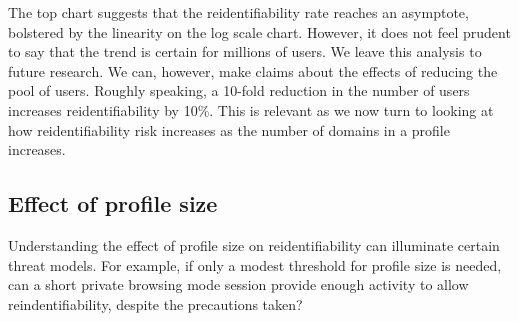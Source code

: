 \documentclass[letterpaper,twocolumn,10pt]{article}
\begin{document}
The top chart suggests that the reidentifiability rate reaches an asymptote, bolstered by the linearity on the log scale chart. 
However, it does not feel prudent to say that the trend is certain for millions of users. 
We leave this analysis to future research. 
We can, however, make claims about the effects of reducing the pool of users. 
Roughly speaking, a 10-fold reduction in the number of users increases reidentifiability by 10\%. 
This is relevant as we now turn to looking at how reidentifiability risk increases as the number of domains in a profile increases.
%
\subsection{Effect of profile size}
\label{ssec:ext-profile-size}
%
Understanding the effect of profile size on reidentifiability can illuminate certain threat models.
For example, if only a modest threshold for profile size is needed, can a short private browsing mode session provide enough activity to allow reindentifiability, despite the precautions taken?
 
\end{document}
